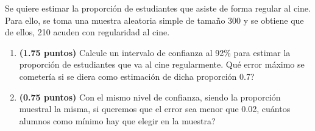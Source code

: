 
Se quiere estimar la proporción de estudiantes que asiste de forma regular al cine. Para ello, se toma una muestra aleatoria simple de tamaño 300 y se obtiene que de ellos, 210 acuden con regularidad al cine.
\begin{enumerate}[label=\alph*)]
\item \textbf{(1.75 puntos)} Calcule un intervalo de confianza al 92\% para estimar la proporción de estudiantes que va al cine regularmente. \textquestiondown{}Qué error máximo se cometería si se diera como estimación de dicha proporción 0.7?
\item \textbf{(0.75 puntos)} Con el mismo nivel de confianza, siendo la proporción muestral la misma, si queremos que el error sea menor que 0.02, \textquestiondown{}cuántos alumnos como mínimo hay que elegir en la muestra?
\end{enumerate}

